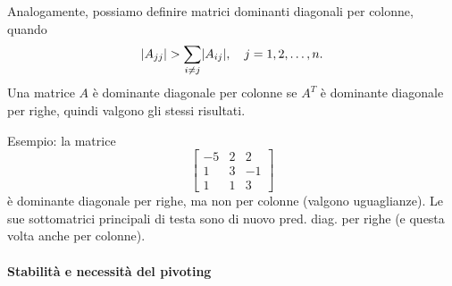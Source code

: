\documentclass[a4paper]{report}
\DeclarePairedDelimiter{\abs}{\lvert}{\rvert}
\theoremstyle{definiton}
\theoremstyle{remark}
\begin{document}
Analogamente, possiamo definire matrici dominanti diagonali per colonne, quando
\[
\abs{A_{jj}} > \sum_{i\neq j} \abs{A_{ij}}, \quad j=1,2,\dots,n.
\]
Una matrice $A$ è dominante diagonale per colonne se $A^T$ è dominante diagonale per righe, quindi valgono gli stessi risultati.

Esempio: la matrice
\[
\begin{bmatrix}
    -5 & 2 & 2\\
    1 & 3 & -1\\
    1 & 1 & 3
\end{bmatrix}
\]
è dominante diagonale per righe, ma non per colonne (valgono uguaglianze). Le sue sottomatrici principali di testa sono di nuovo pred. diag. per righe (e questa volta anche per colonne).



\paragraph{Stabilità e necessità del pivoting}
\end{document}
